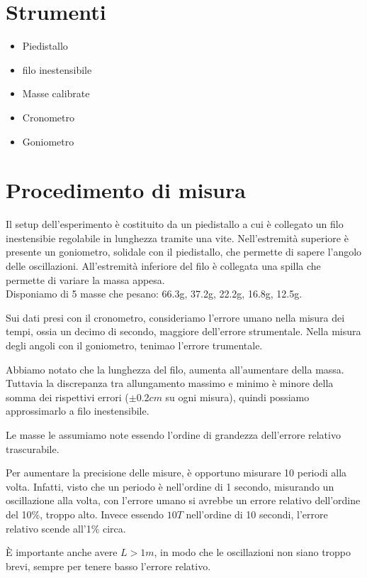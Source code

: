\documentclass[12pt, a4paper]{article}
\begin{document}
\section{Strumenti}
    \begin{itemize}
        \item Piedistallo 
        \item filo inestensibile
        \item Masse calibrate
        \item Cronometro 
        \item Goniometro 
    \end{itemize}

    
\section{Procedimento di misura}
Il setup dell'esperimento è costituito da un piedistallo a cui è collegato un filo inestensibie regolabile in lunghezza tramite una vite. Nell'estremità superiore è presente un goniometro, solidale con il piedistallo, che permette di sapere l'angolo delle oscillazioni. All'estremità inferiore del filo è collegata una spilla che permette di variare la massa appesa. \\
Disponiamo di 5 masse che pesano: 66.3g, 37.2g, 22.2g, 16.8g, 12.5g.

Sui dati presi con il cronometro, consideriamo l'errore umano nella misura dei tempi, ossia un decimo di secondo, maggiore dell'errore strumentale. 
Nella misura degli angoli con il goniometro, tenimao l'errore trumentale. 

Abbiamo notato che la lunghezza del filo, aumenta all'aumentare della massa. Tuttavia la discrepanza tra allungamento massimo e minimo è minore della somma dei rispettivi errori ($\pm0.2cm$ su ogni misura), quindi possiamo approssimarlo a filo inestensibile.

Le masse le assumiamo note essendo l'ordine di grandezza dell'errore relativo trascurabile.

Per aumentare la precisione delle misure, è opportuno misurare 10 periodi alla volta.
Infatti, visto che un periodo è nell'ordine di 1 secondo, misurando un oscillazione alla volta, con l'errore umano si avrebbe un errore relativo dell'ordine del 10\%, troppo alto.
Invece essendo $10T$ nell'ordine di 10 secondi, l'errore relativo scende all'1\% circa.

È importante anche avere $L > 1m$, in modo che le oscillazioni non siano troppo brevi, sempre per tenere basso l'errore relativo.
\end{document}
